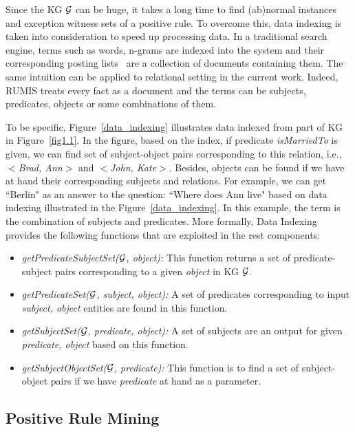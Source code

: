 Since the KG $\mathcal{G}$ can be huge, it takes a long time to find (ab)normal instances and exception witness sets of a positive rule. To overcome this, data indexing is taken into consideration to speed up processing data. In a traditional search engine, terms such as words, n-grams are indexed into the system and their corresponding posting lists~\cite{ref47} are a collection of documents containing them. The same intuition can be applied to relational setting in the current work. Indeed, RUMIS treats every fact as a document and the terms can be subjects, predicates, objects or some combinations of them.

To be specific, Figure~\ref{data_indexing} illustrates data indexed from part of KG in Figure~\ref{fig1.1}. In the figure, based on the index, if predicate \textit{isMarriedTo} is given, we can find set of subject-object pairs corresponding to this relation, i.e., \textit{$<$Brad, Ann$>$} and \textit{$<$John, Kate$>$}. Besides, objects can be found if we have at hand their corresponding subjects and relations. For example, we can get ``Berlin" as an answer to the question: ``Where does Ann live" based on data indexing illustrated in the Figure~\ref{data_indexing}. In this example, the term is the combination of subjects and predicates. More formally, Data Indexing provides the following functions that are exploited in the rest components:

\begin{itemize}
\item \textit{getPredicateSubjectSet($\mathcal{G}$, object):} This function returns a set of predicate-subject pairs corresponding to a given \textit{object} in KG $\mathcal{G}$.
\item \textit{getPredicateSet($\mathcal{G}$, subject, object):} A set of predicates corresponding to input \textit{subject, object} entities are found in this function.
\item \textit{getSubjectSet($\mathcal{G}$, predicate, object):} A set of subjects are an output for given \textit{predicate, object} based on this function.
\item \textit{getSubjectObjectSet($\mathcal{G}$, predicate):} This function is to find a set of subject-object pairs if we have \textit{predicate} at hand as a parameter.
\end{itemize}

\subsection{Positive Rule Mining}

